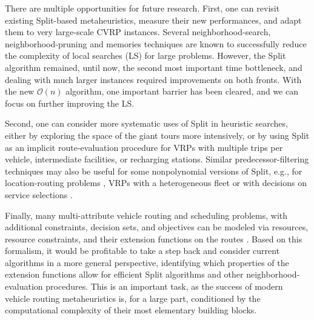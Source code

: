 \documentclass[11pt]{article}
\newcommand{\cO}{{\mathcal O}}
\newcommand{\blue}[1]{{#1}}
\begin{document}
\blue{There are multiple opportunities for future research.
First, one can revisit existing Split-based metaheuristics, measure their new performances, and adapt them to very large-scale CVRP instances.
Several neighborhood-search, neighborhood-pruning and memories techniques \citep{Bentley1992,Toth2003,Irnich2006,Vidal2012b} are known to successfully reduce the complexity of local searches (LS) for large problems. However, the Split algorithm remained, until now, the second most important time bottleneck, and dealing with much larger instances required improvements on both fronts. With the new $\cO(n)$ algorithm, one important barrier has been cleared, and we can focus on further improving the LS.





Second, one can consider more systematic uses of Split in heuristic searches, either by exploring the space of the giant tours \citep{Prins2004,Prins2009c} more intensively, or by using Split as an implicit route-evaluation procedure \citep{Vidal2015,Vidal2014} for VRPs with multiple trips per vehicle, intermediate facilities, or recharging stations.
Similar predecessor-filtering techniques may also be useful for some nonpolynomial versions of Split, e.g., for location-routing problems \citep{Duhamel2010}, VRPs with a heterogeneous fleet \citep{Duhamel2011a} or with decisions on service selections \citep{Vidal2014}.}

Finally, many multi-attribute vehicle routing and scheduling problems, with additional constraints, decision sets, and objectives can be modeled via resources, resource constraints, and their extension functions on the routes \citep{Desaulniers1998a,Irnich2008b}. Based on this formalism, it would be profitable to take a step back and consider current algorithms in a more general perspective, identifying which properties of the extension functions allow for efficient Split algorithms and other neighborhood-evaluation procedures. This is an important task, as the success of modern vehicle routing metaheuristics is, for a large part, conditioned by the computational complexity of their most elementary building blocks.
\end{document}
